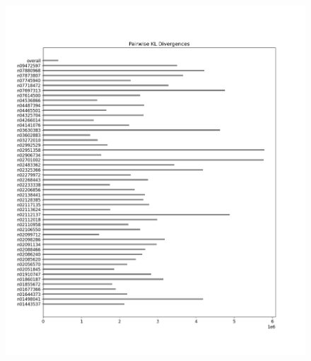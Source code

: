 \documentclass{article}
\begin{document}
\begin{figure}[H]
\begin{minipage}{0.45\textwidth}
        \end{minipage}\hfill
        \begin{minipage}{0.45\textwidth}
            \centering
            \includegraphics[width=\textwidth]{cross_imagenet_imgr_r_second_last/alexnet_kl_div_b_to_apairwise.png} %
        \end{minipage}
        \begin{minipage}{0.45\textwidth}
            \centering

\end{minipage}
\end{figure}
\end{document}
